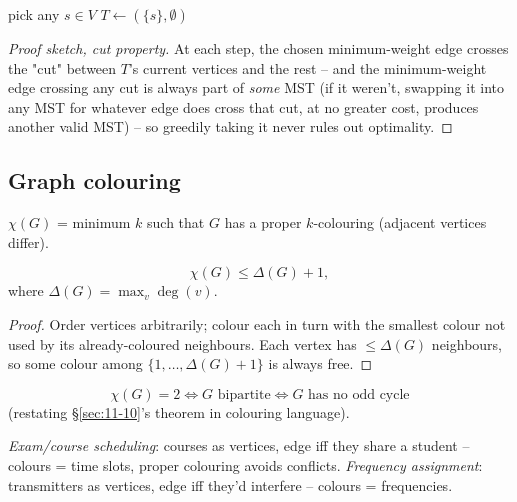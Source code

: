 \documentclass[11pt]{article}
\begin{document}
\bigskip
\begin{algorithm}[H]
\SetAlgoLined
{}
pick any $s\in V$\; $T\gets(\{s\},\emptyset)$\;
\caption{Prim's algorithm}
\end{algorithm}

\begin{theorem}
\end{theorem}
\begin{proof}[Proof sketch, cut property]
At each step, the chosen minimum-weight edge crosses the "cut" between $T$'s current vertices and the rest -- and the minimum-weight edge crossing any cut is always part of \emph{some} MST (if it weren't, swapping it into any MST for whatever edge does cross that cut, at no greater cost, produces another valid MST) -- so greedily taking it never rules out optimality.
\end{proof}

\subsection{Graph colouring}
\label{sec:12-5-2}

\begin{definition}
$\chi(G)$ = minimum $k$ such that $G$ has a proper $k$-colouring (adjacent vertices differ).
\end{definition}

\begin{theorem}
\[
\chi(G) \le \Delta(G)+1,
\]
where $\Delta(G)=\max_v\deg(v)$.
\end{theorem}
\begin{proof}
Order vertices arbitrarily; colour each in turn with the smallest colour not used by its already-coloured neighbours. Each vertex has $\le\Delta(G)$ neighbours, so some colour among $\{1,\dots,\Delta(G)+1\}$ is always free.
\end{proof}

\begin{theorem}
\[
\chi(G) = 2 \iff G \text{ bipartite} \iff G \text{ has no odd cycle}
\]
(restating \S\ref{sec:11-10}'s theorem in colouring language).
\end{theorem}

\begin{example}
\emph{Exam/course scheduling}: courses as vertices, edge iff they share a student -- colours = time slots, proper colouring avoids conflicts. \emph{Frequency assignment}: transmitters as vertices, edge iff they'd interfere -- colours = frequencies.
\end{example}
\end{document}
